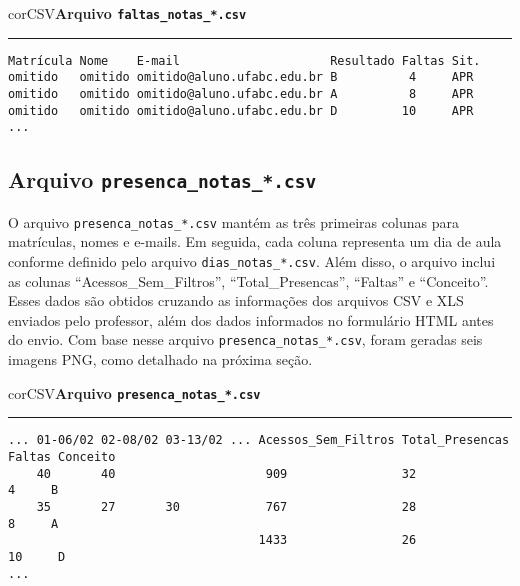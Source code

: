 \begin{myboxCode}{corCSV}{\textbf{Arquivo \texttt{faltas\_notas\_*.csv}}}\vspace{3mm}
\hrule
\begin{verbatim}
Matrícula Nome    E-mail                     Resultado Faltas Sit.
omitido   omitido omitido@aluno.ufabc.edu.br B          4     APR
omitido   omitido omitido@aluno.ufabc.edu.br A          8     APR
omitido   omitido omitido@aluno.ufabc.edu.br D         10     APR     
...
\end{verbatim}
\end{myboxCode}

\subsection{Arquivo \texttt{presenca\_notas\_*.csv}}

O arquivo \texttt{presenca\_notas\_*.csv} mantém as três primeiras colunas para matrículas, nomes e e-mails. Em seguida, cada coluna representa um dia de aula conforme definido pelo arquivo \texttt{dias\_notas\_*.csv}. Além disso, o arquivo inclui as colunas ``Acessos\_Sem\_Filtros'', ``Total\_Presencas'', ``Faltas'' e ``Conceito''. Esses dados são obtidos cruzando as informações dos arquivos CSV e XLS enviados pelo professor, além dos dados informados no formulário HTML antes do envio. Com base nesse arquivo \texttt{presenca\_notas\_*.csv}, foram geradas seis imagens PNG, como detalhado na próxima seção.

\begin{myboxCode}{corCSV}{\textbf{Arquivo \texttt{presenca\_notas\_*.csv}}}\vspace{3mm}
\hrule
\begin{verbatim}
... 01-06/02 02-08/02 03-13/02 ... Acessos_Sem_Filtros Total_Presencas Faltas Conceito
    40       40                     909                32               4     B
    35       27       30            767                28               8     A
                                   1433	               26              10     D
...
\end{verbatim}
\end{myboxCode}




